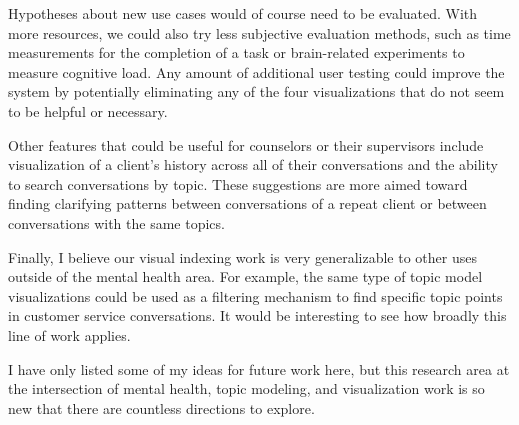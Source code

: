 Hypotheses about new use cases would of course need to be evaluated. With
more resources, we could also try less subjective evaluation methods, such as time
measurements for the completion of a task or brain-related experiments to measure
cognitive load. Any amount of additional user testing could improve the system by
potentially eliminating any of the four visualizations that do not seem to be helpful
or necessary.

Other features that could be useful for counselors or their supervisors include
visualization of a client's history across all of their conversations and the ability to
search conversations by topic. These suggestions are more aimed toward finding
clarifying patterns between conversations of a repeat client or between conversations
with the same topics.

Finally, I believe our visual indexing work is very generalizable to other uses
outside of the mental health area. For example, the same type of topic model
visualizations could be used as a filtering mechanism to find specific topic points in
customer service conversations. It would be interesting to see how broadly this line
of work applies.

I have only listed some of my ideas for future work here, but this research area at the
intersection of mental health, topic modeling, and visualization work is so new that
there are countless directions to explore.
